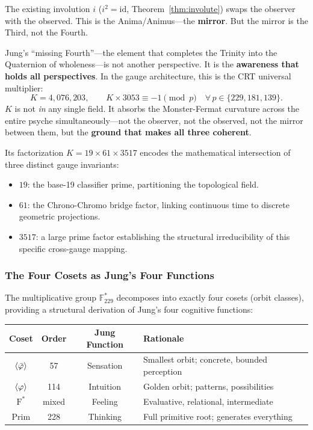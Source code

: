 The existing involution $i$ ($i^2 = \mathrm{id}$, Theorem~\ref{thm:involute}) swaps the observer with the observed. This is the Anima/Animus---the \textbf{mirror}. But the mirror is the Third, not the Fourth.

Jung's ``missing Fourth''---the element that completes the Trinity into the Quaternion of wholeness---is not another perspective. It is the \textbf{awareness that holds all perspectives}. In the gauge architecture, this is the CRT universal multiplier:
\begin{equation}
    K = 4{,}076{,}203, \qquad K \times 3053 \equiv -1 \pmod{p} \quad \forall\, p \in \{229, 181, 139\}.
\end{equation}
$K$ is not \emph{in} any single field. It absorbs the Monster-Fermat curvature across the entire psyche simultaneously---not the observer, not the observed, not the mirror between them, but the \textbf{ground that makes all three coherent}.

Its factorization $K = 19 \times 61 \times 3517$ encodes the mathematical intersection of three distinct gauge invariants:
\begin{itemize}[noitemsep]
    \item $19$: the base-19 classifier prime, partitioning the topological field.
    \item $61$: the Chrono-Chromo bridge factor, linking continuous time to discrete geometric projections.
    \item $3517$: a large prime factor establishing the structural irreducibility of this specific cross-gauge mapping.
\end{itemize}

\subsubsection{The Four Cosets as Jung's Four Functions}

The multiplicative group $\mathbb{F}_{229}^*$ decomposes into exactly four cosets (orbit classes), providing a structural derivation of Jung's four cognitive functions:

\begin{center}
\begin{tabular}{@{}cccl@{}}
\toprule
\textbf{Coset} & \textbf{Order} & \textbf{Jung Function} & \textbf{Rationale} \\
\midrule
$\langle\bar{\varphi}\rangle$ & 57 & Sensation & Smallest orbit; concrete, bounded perception \\
$\langle\varphi\rangle$ & 114 & Intuition & Golden orbit; patterns, possibilities \\
$\mathrm{F}^*$ & mixed & Feeling & Evaluative, relational, intermediate \\
Prim & 228 & Thinking & Full primitive root; generates everything \\
\bottomrule
\end{tabular}
\end{center}


